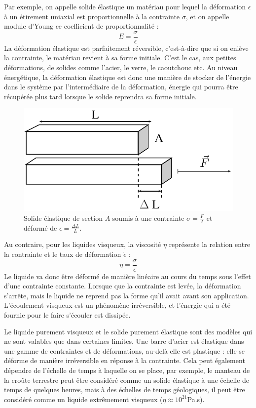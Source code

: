 \documentclass{report}
\begin{document}
Par exemple, on appelle solide élastique un matériau pour lequel la déformation $\epsilon$ à un étirement uniaxial est proportionnelle à la contrainte $ \sigma$, et on appelle module d'Young ce coefficient de proportionnalité : 
$$ E = \frac{\sigma}{\epsilon}$$
La déformation élastique est parfaitement réversible, c'est-à-dire que si on enlève la contrainte, le matériau revient à sa forme initiale. C'est le cas, aux petites déformations, de solides comme l'acier, le verre, le caoutchouc etc. Au niveau énergétique, la déformation élastique est donc une manière de stocker de l'énergie dans le système par l'intermédiaire de la déformation, énergie qui pourra être récupérée plus tard lorsque le solide reprendra sa forme initiale. 

\begin{figure}
\includegraphics[scale=0.5]{Figures/Young_modulus.pdf} 
\caption{Solide élastique de section $A$ soumis à une contrainte $\sigma=\frac{F}{A}$ et déformé de $\epsilon=\frac{\Delta L}{L}$.  }
\end{figure}

Au contraire, pour les liquides visqueux, la viscosité $\eta$ représente la relation entre la contrainte et le taux de déformation $\dot{\epsilon}$ : 
$$ \eta=\frac{\sigma}{\dot{\epsilon}}$$
Le liquide va donc être déformé de manière linéaire au cours du temps sous l'effet d'une contrainte constante. Lorsque que la contrainte est levée, la déformation s'arrête, mais le liquide ne reprend pas la forme qu'il avait avant son application. 
L'écoulement visqueux est un phénomène irréversible, et l'énergie qui a été fournie pour le faire s'écouler est dissipée. 

Le liquide purement visqueux et le solide purement élastique sont des modèles qui ne sont valables que dans certaines limites. Une barre d'acier est élastique dans une gamme de contraintes et de déformations, au-delà elle est plastique : elle se déforme de manière irréversible en réponse à la contrainte. 
Cela peut également dépendre de l'échelle de temps à laquelle on se place, par exemple, le manteau de la croûte terrestre peut être considéré comme un solide élastique à une échelle de temps de quelques heures, mais à des échelles de temps géologiques, il peut être considéré comme un liquide extrêmement visqueux ($\eta \approx 10^{21}$Pa.s). 
\end{document}

